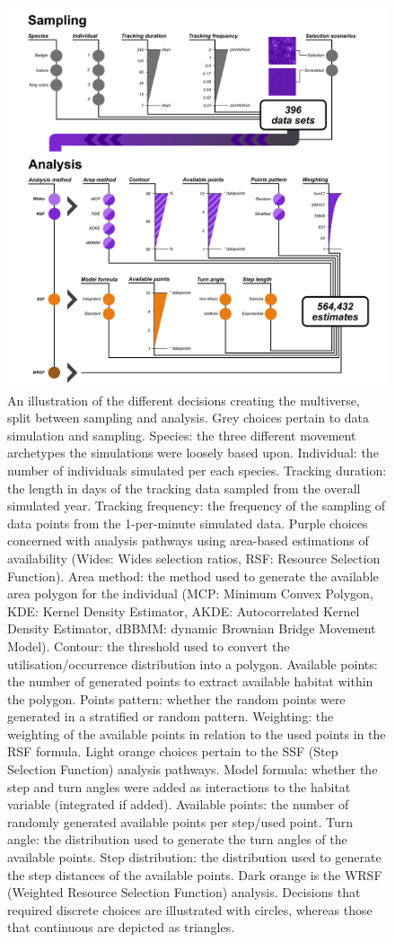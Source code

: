\documentclass[10pt,a4paper]{article}
\begin{document}
\begin{figure}
\includegraphics[width=1\linewidth]{../ext_images/Decision Visualisation} \caption{An illustration of the different decisions creating the multiverse, split between sampling and analysis. Grey choices pertain to data simulation and sampling. Species: the three different movement archetypes the simulations were loosely based upon. Individual: the number of individuals simulated per each species. Tracking duration: the length in days of the tracking data sampled from the overall simulated year. Tracking frequency: the frequency of the sampling of data points from the 1-per-minute simulated data. Purple choices concerned with analysis pathways using area-based estimations of availability (Wides: Wides selection ratios, RSF: Resource Selection Function). Area method: the method used to generate the available area polygon for the individual (MCP: Minimum Convex Polygon, KDE: Kernel Density Estimator, AKDE: Autocorrelated Kernel Density Estimator, dBBMM: dynamic Brownian Bridge Movement Model). Contour: the threshold used to convert the utilisation/occurrence distribution into a polygon. Available points: the number of generated points to extract available habitat within the polygon. Points pattern: whether the random points were generated in a stratified or random pattern. Weighting: the weighting of the available points in relation to the used points in the RSF formula. Light orange choices pertain to the SSF (Step Selection Function) analysis pathways. Model formula: whether the step and turn angles were added as interactions to the habitat variable (integrated if added). Available points: the number of randomly generated available points per step/used point. Turn angle: the distribution used to generate the turn angles of the available points. Step distribution: the distribution used to generate the step distances of the available points. Dark orange is the WRSF (Weighted Resource Selection Function) analysis. Decisions that required discrete choices are illustrated with circles, whereas those that continuous are depicted as triangles.}\label{fig:decisionTrees}

\end{figure}
\end{document}
